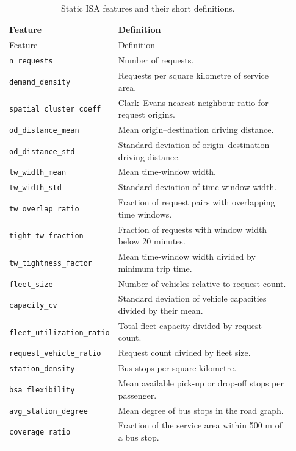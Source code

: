 \begin{longtable}{@{}p{0.30\linewidth}p{0.63\linewidth}@{}}
\caption{Static ISA features and their short definitions.}\\
\toprule
Feature & Definition\\
\midrule
\endfirsthead
\toprule
Feature & Definition\\
\midrule
\endhead
\texttt{n\_requests} & Number of requests.\\
\texttt{demand\_density} & Requests per square kilometre of service area.\\
\texttt{spatial\_cluster\_coeff} & Clark--Evans nearest-neighbour ratio for request origins.\\
\texttt{od\_distance\_mean} & Mean origin--destination driving distance.\\
\texttt{od\_distance\_std} & Standard deviation of origin--destination driving distance.\\
\texttt{tw\_width\_mean} & Mean time-window width.\\
\texttt{tw\_width\_std} & Standard deviation of time-window width.\\
\texttt{tw\_overlap\_ratio} & Fraction of request pairs with overlapping time windows.\\
\texttt{tight\_tw\_fraction} & Fraction of requests with window width below 20 minutes.\\
\texttt{tw\_tightness\_factor} & Mean time-window width divided by minimum trip time.\\
\texttt{fleet\_size} & Number of vehicles relative to request count.\\
\texttt{capacity\_cv} & Standard deviation of vehicle capacities divided by their mean.\\
\texttt{fleet\_utilization\_ratio} & Total fleet capacity divided by request count.\\
\texttt{request\_vehicle\_ratio} & Request count divided by fleet size.\\
\texttt{station\_density} & Bus stops per square kilometre.\\
\texttt{bsa\_flexibility} & Mean available pick-up or drop-off stops per passenger.\\
\texttt{avg\_station\_degree} & Mean degree of bus stops in the road graph.\\
\texttt{coverage\_ratio} & Fraction of the service area within 500 m of a bus stop.\\
\bottomrule
\end{longtable}

